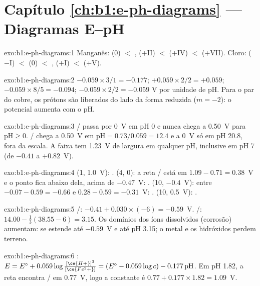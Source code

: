 \section*{Capítulo \ref{ch:b1:e-ph-diagrams} --- Diagramas E--pH}

\begin{solution}{exo:b1:e-ph-diagrams:1}
Manganês:  (0) $<$ ,  ($+$II) $<$ 
($+$IV) $<$  ($+$VII). Cloro:  ($-$I) $<$  (0)
$<$ ,  ($+$I) $<$  ($+$V).
\end{solution}

\begin{solution}{exo:b1:e-ph-diagrams:2}
$-0.059 \times 3/1 = -0.177$; $+0.059 \times 2/2 = +0.059$;
$-0.059 \times 8/5 = -0.094$; $-0.059 \times 2/2 = -0.059$ V por unidade
de pH. Para o par do cobre, os prótons são liberados do lado da forma
reduzida ($m = -2$): o potencial aumenta com o pH.
\end{solution}

\begin{solution}{exo:b1:e-ph-diagrams:3}
/ passa por 0~V em pH 0 e nunca chega a 0.50~V para
$\mathrm{pH} \geqslant 0$. / chega a 0.50~V em
$\mathrm{pH} = 0.73/0.059 = 12.4$ e a 0~V só em pH 20.8, fora da escala.
A faixa tem \qty{1.23}{V} de largura em qualquer pH, inclusive em pH 7
(de $-0.41$ a $+0.82$~V).
\end{solution}

\begin{solution}{exo:b1:e-ph-diagrams:4}
(1, 1.0~V): . (4, 0): a reta / está em
$1.09 - 0.71 = 0.38$~V e o ponto fica abaixo dela, acima de $-0.47$~V:
. (10, $-0.4$~V): entre $-0.07 - 0.59 = -0.66$ e $0.28 -
0.59 = -0.31$~V: . (10, 0.5~V): .
\end{solution}

\begin{solution}{exo:b1:e-ph-diagrams:5}
/: $-0.41 + 0.030 \times (-6) = -0.59$~V.
/: $14.00 - \frac13(38.55 - 6) = 3.15$. Os domínios
dos íons dissolvidos (corrosão) aumentam:  se estende até
$-0.59$~V e  até pH 3.15; o metal e os hidróxidos perdem
terreno.
\end{solution}

\begin{solution}{exo:b1:e-ph-diagrams:6}
: $E = E^\circ + 0.059\log\frac{[\ce{H+}]^3}{[\ce{Fe^2+}]}
= (E^\circ - 0.059\log c) - 0.177\,\mathrm{pH}$. Em pH 1.82, a reta
encontra / em 0.77~V, logo a constante é $0.77 + 0.177 \times 1.82
= 1.09$~V.
\end{solution}

